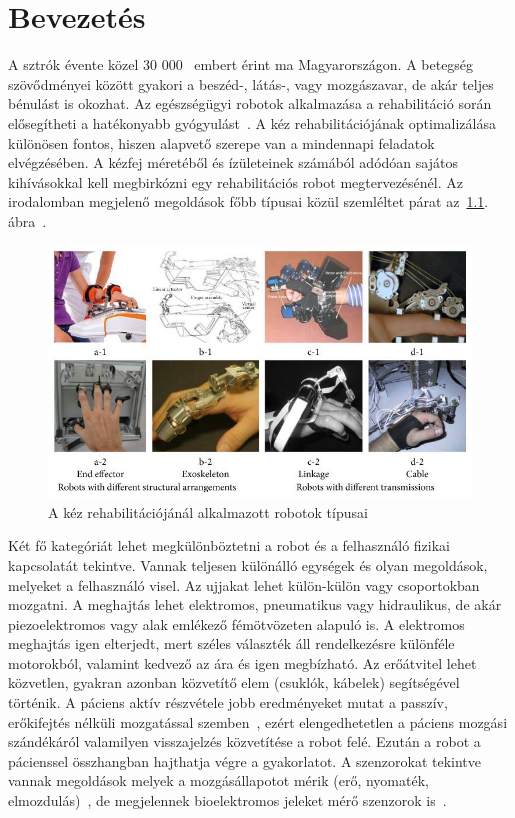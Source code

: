 \chapter{Bevezetés}

A sztrók évente közel 30 000~\cite{Bereczki2023} embert érint ma Magyarországon. A betegség szövődményei között gyakori 
a beszéd-, látás-, vagy mozgászavar, de akár teljes bénulást is okozhat. Az egészségügyi robotok alkalmazása a 
rehabilitáció során elősegítheti a hatékonyabb gyógyulást~\cite{Chang2013}. A kéz rehabilitációjának optimalizálása 
különösen fontos, hiszen alapvető szerepe van a mindennapi feladatok elvégzésében. A kézfej méretéből és ízületeinek számából 
adódóan sajátos kihívásokkal kell megbirkózni egy rehabilitációs robot megtervezésénél.
Az irodalomban megjelenő megoldások főbb típusai közül szemléltet párat az~\ref{fig:hand_rehab_robot_types}. ábra~\cite{Yue2017}.
\begin{figure}[ht]
    \begin{center}
    \includegraphics[width=12cm]{images/hand_rehab_robot_types.jpeg}
    \caption{A kéz rehabilitációjánál alkalmazott robotok típusai}\label{fig:hand_rehab_robot_types}
    \end{center}
\end{figure}
Két fő kategóriát lehet megkülönböztetni a robot és a felhasználó fizikai kapcsolatát tekintve. Vannak teljesen 
különálló egységek és olyan megoldások, melyeket a felhasználó visel. Az ujjakat lehet külön-külön vagy 
csoportokban mozgatni. A meghajtás lehet elektromos, pneumatikus vagy hidraulikus, de akár piezoelektromos vagy 
alak emlékező fémötvözeten alapuló is. A elektromos meghajtás igen elterjedt, mert széles választék áll rendelkezésre különféle motorokból, 
valamint kedvező az ára és igen megbízható. Az erőátvitel lehet közvetlen, gyakran azonban közvetítő elem (csuklók, kábelek) 
segítségével történik. A páciens aktív részvétele jobb eredményeket mutat a passzív, erőkifejtés nélküli mozgatással 
szemben~\cite{Remsik2016}, ezért elengedhetetlen a páciens mozgási szándékáról valamilyen visszajelzés közvetítése a robot felé.
Ezután a robot a pácienssel összhangban hajthatja végre a gyakorlatot.
A szenzorokat tekintve vannak megoldások melyek a mozgásállapotot mérik (erő, nyomaték, elmozdulás)~\cite{Bauer2021}, de megjelennek 
bioelektromos jeleket mérő szenzorok is~\cite{Satakogiou}. 

